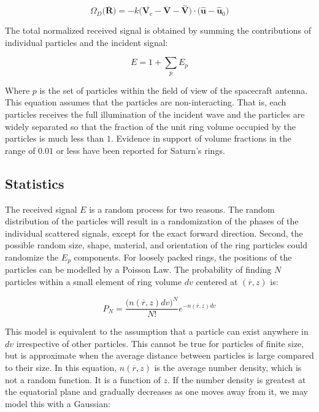 \documentclass{article}
\theoremstyle{mystyle}
\begin{document}
\begin{equation}
\Omega_{D}\big(\overline{\mathbf{R}}\big) = -k\big(\overline{\mathbf{V}_{c}} - \overline{\mathbf{V}}-\overset{\sim}{\mathbf{V}}\big)\cdot \big(\hat{\mathbf{u}} - \hat{\mathbf{u}}_{0}\big)
\end{equation}

The total normalized received signal is obtained by summing the contributions of individual particles and the incident signal:

\begin{equation}
E = 1+\sum_{p} E_{p}
\end{equation}

Where $p$ is the set of particles within the field of view of the spacecraft antenna. This equation assumes that the particles are non-interacting. That is, each particles receives the full illumination of the incident wave and the particles are widely separated so that the fraction of the unit ring volume occupied by the particles is much less than $1$. Evidence in support of volume fractions in the range of $0.01$ or less have been reported for Saturn's rings. 

\subsection{Statistics}

The received signal $E$ is a random process for two reasons. The random distribution of the particles will result in a randomization of the phases of the individual scattered signals, except for the exact forward direction. Second, the possible random size, shape, material, and orientation of the ring particles could randomize the $E_{p}$ components. For loosely packed rings, the positions of the particles can be modelled by a Poisson Law. The probability of finding $N$ particles within a small element of ring volume $dv$ centered at $(\overline{r},z)$ is:

\begin{equation}
P_{N} = \frac{\big(n(\overline{r},z)dv\big)^N}{N!}e^{-n(\overline{r},z)dv}
\end{equation}

This model is equivalent to the assumption that a particle can exist anywhere in $dv$ irrespective of other particles. This cannot be true for particles of finite size, but is approximate when the average distance between particles is large compared to their size. In this equation, $n(\overline{r},z)$ is the average number density, which is not a random function. It is a function of $z$. If the number density is greatest at the equatorial plane and gradually decreases as one moves away from it, we may model this with a Gaussian:
\end{document}

